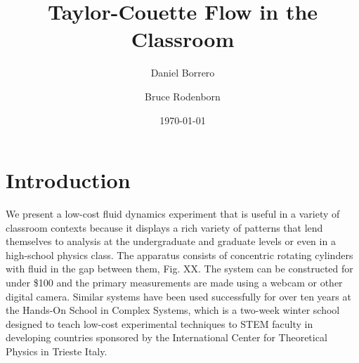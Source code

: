 \documentclass[%
 amsmath,amssymb,
 aps,
floatfix,
aps,prd,longbibliography,
notitlepage
]{revtex4-1}
\begin{document}

\title{Taylor-Couette Flow in the Classroom}


\author{Daniel Borrero}
 
\author{Bruce Rodenborn}%
\date{\today}%

\begin{abstract}


\end{abstract}

\maketitle


\section{Introduction}

We present a low-cost fluid dynamics experiment that is useful in a variety of classroom contexts because it displays a rich variety of patterns that lend themselves to analysis at the undergraduate and graduate levels or even in a high-school physics class. The apparatus consists of concentric rotating cylinders with fluid in the gap between them, Fig. XX. The system can be constructed for under \$100 and the primary measurements are made using a webcam or other digital camera. Similar systems have been used successfully for over ten years at the Hands-On School in Complex Systems, which is a two-week winter school designed to teach low-cost experimental techniques to STEM faculty in developing countries sponsored by the International Center for Theoretical Physics in Trieste Italy.
\end{document}
